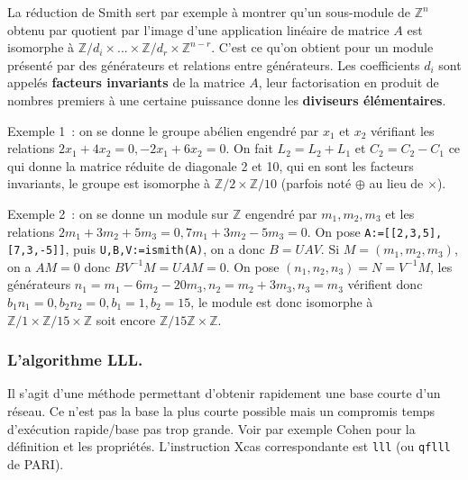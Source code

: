 \documentclass[a4paper,11pt]{article}
\begin{document}
\begin{giacjshere}
La r\'eduction de Smith sert par exemple \`a montrer
qu'un sous-module de $\mathbb{Z}^n$ obtenu par quotient par l'image 
d'une application lin\'eaire de matrice $A$ est isomorphe 
\`a $\mathbb{Z}/d_i \times ... \times \mathbb{Z}/d_r \times \mathbb{Z}^{n-r}$. C'est ce
qu'on obtient pour un module pr\'esent\'e par des g\'en\'erateurs
et relations entre g\'en\'erateurs.
Les coefficients $d_i$ sont appel\'es {\bf facteurs
invariants} de la
matrice $A$, leur factorisation en produit de nombres 
premiers \`a une certaine puissance donne les {\bf diviseurs 
\'el\'ementaires}.

Exemple 1~: on se donne le groupe ab\'elien engendr\'e par $x_1$ et
$x_2$ v\'erifiant les relations $2x_1+4x_2=0, -2x_1+6x_2=0$. On fait
$L_2=L_2+L_1$ et $C_2=C_2-C_1$ ce qui donne la matrice r\'eduite
de diagonale 2 et 10, qui en sont les facteurs invariants, le groupe
est isomorphe \`a $\mathbb{Z}/2 \times \mathbb{Z}/10$ (parfois not\'e 
$\oplus$ au lieu de $\times$).

Exemple 2~: on se donne un module sur $\mathbb{Z}$ engendr\'e par $m_1,m_2,m_3$
et les relations $2m_1+3m_2+5m_3=0, 7m_1+3m_2-5m_3=0$.
On pose \verb|A:=[[2,3,5],[7,3,-5]]|, puis
\verb|U,B,V:=ismith(A)|, on a donc $B=UAV$.
Si $M=(m_1,m_2,m_3)$, on a $AM=0$ donc $B V^{-1}M=UAM=0$.
On pose $(n_1,n_2,n_3)=N=V^{-1}M$, 
les g\'en\'erateurs $n_1=m_1-6m_2-20m_3, n_2=m_2+3m_3,n_3=m_3$
v\'erifient donc $b_1 n_1=0, b_2n_2=0, b_1=1, b_2=15$, le module est donc
isomorphe \`a  $\mathbb{Z}/1 \times \mathbb{Z}/15 \times \mathbb{Z}$ soit encore $\mathbb{Z}/15\mathbb{Z}
\times \mathbb{Z}$.

\subsubsection{L'algorithme LLL.} 
Il s'agit d'une m\'ethode permettant d'obtenir rapidement
une base courte d'un r\'eseau. Ce n'est pas la base la plus courte
possible mais un compromis temps d'ex\'ecution rapide/base
pas trop grande. Voir par exemple Cohen pour la d\'efinition
et les propri\'et\'es. L'instruction Xcas correspondante est
\verb|lll| (ou \verb|qflll| de PARI).


\end{giacjshere}
\end{document}
